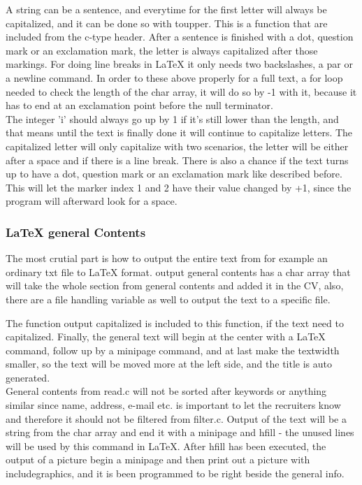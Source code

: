 A string can be a sentence, and everytime for the first letter will always be capitalized,
and it can be done so with toupper.
This is a function that are included from the c-type header.
After a sentence is finished with a dot, question mark or an exclamation mark, 
the letter is always capitalized after those markings.
For doing line breaks in LaTeX it only needs two backslashes, a par or a newline command. 
In order to these above properly for a full text, a for loop needed to check the length of the char array,
it will do so by -1 with it, because it has to end at an exclamation point before the null terminator.\\

The integer 'i' should always go up by 1 if it's still lower than the length, 
and that means until the text is finally done 
it will continue to capitalize letters. The capitalized letter will only capitalize with two scenarios, 
the letter will be either after a space and if there is a line break.
There is also a chance if the text turns up to have a dot, question mark or an exclamation mark like described before.
This will let the marker index 1 and 2 have their value changed by +1, since the program will afterward look for a space.\\

\subsubsection{LaTeX general Contents}
The most crutial part is how to output the entire text from for example an ordinary txt file to LaTeX format.
output general contents has a char array that will take the whole section from general contents and added it in the CV,
also, there are a file handling variable as well to output the text to a specific file. 

The function output capitalized is included to this function, if the text need to capitalized.
Finally, the general text will begin at the center with a LaTeX command, follow up by a minipage command, 
and at last make the textwidth smaller, so the text will be moved more at the left side, and the title is auto generated. \\

General contents from read.c will not be sorted after keywords or anything similar 
since name, address, e-mail etc. is important to let the recruiters know and therefore it should not be filtered from filter.c.
Output of the text will be a string from the char array 
and end it with a minipage and hfill - the unused lines will be used by this command in LaTeX.
After hfill has been executed, the output of a picture begin a minipage 
and then print out a picture with includegraphics, and it is been programmed to be right beside the general info. 

